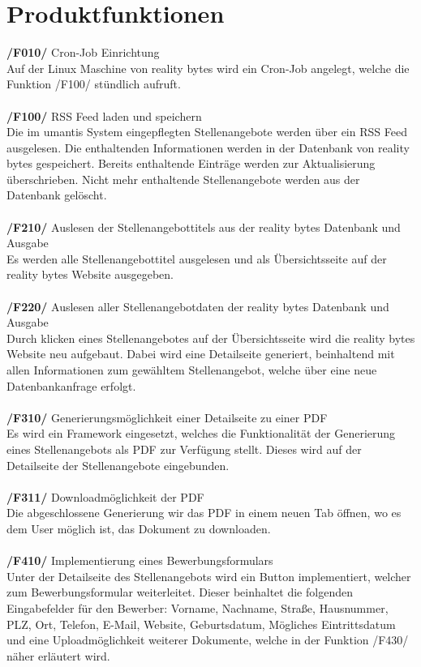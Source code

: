 \section{Produktfunktionen}
\textbf{/F010/} Cron-Job Einrichtung \\
Auf der Linux Maschine von reality bytes wird ein Cron-Job angelegt, welche die Funktion /F100/ stündlich aufruft.
\\ \\
\textbf{/F100/} RSS Feed laden und speichern \\
Die im umantis System eingepflegten Stellenangebote werden über ein RSS Feed ausgelesen.
Die enthaltenden Informationen werden in der Datenbank von reality bytes gespeichert.
Bereits enthaltende Einträge werden zur Aktualisierung überschrieben.
Nicht mehr enthaltende Stellenangebote werden aus der Datenbank gelöscht.
\\ \\
\textbf{/F210/} Auslesen der Stellenangebottitels aus der reality bytes Datenbank und Ausgabe \\
Es werden alle Stellenangebottitel ausgelesen und als Übersichtsseite auf der reality bytes Website ausgegeben.
\\ \\
\textbf{/F220/} Auslesen aller Stellenangebotdaten der reality bytes Datenbank und Ausgabe \\
Durch klicken eines Stellenangebotes auf der Übersichtsseite wird die reality bytes Website neu aufgebaut. Dabei wird eine Detailseite generiert, beinhaltend mit allen Informationen zum gewähltem Stellenangebot, welche über eine neue Datenbankanfrage erfolgt.
\\ \\
\textbf{/F310/} Generierungsmöglichkeit einer Detailseite zu einer PDF \\
Es wird ein Framework eingesetzt, welches die Funktionalität der Generierung eines Stellenangebots als PDF zur Verfügung stellt. Dieses wird auf der Detailseite der Stellenangebote eingebunden.
\\ \\
\textbf{/F311/} Downloadmöglichkeit der PDF \\
Die abgeschlossene Generierung wir das PDF in einem neuen Tab öffnen, wo es dem User möglich ist, das Dokument zu downloaden.
\\ \\
\textbf{/F410/} Implementierung eines Bewerbungsformulars\\
Unter der Detailseite des Stellenangebots wird ein Button implementiert, welcher zum Bewerbungsformular weiterleitet. Dieser beinhaltet die folgenden Eingabefelder für den Bewerber: Vorname, Nachname, Straße, Hausnummer, PLZ, Ort, Telefon, E-Mail, Website, Geburtsdatum, Mögliches Eintrittsdatum und eine Uploadmöglichkeit weiterer Dokumente, welche in der Funktion /F430/ näher erläutert wird.
